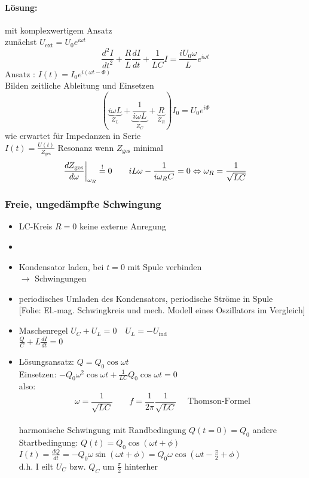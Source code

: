 \documentclass[titlepage,12pt,a4paper,ngerman]{report}
\newcommand{\tx}[1]{\textrm{#1}}
\newcommand{\ub}[1]{\underbrace{#1}}
\newcommand{\uind}{U_{\tx{ind}}}
\newcommand{\folie}[1]{\color{gray}[Folie: #1]\color{black}}
\begin{document}
\paragraph{Lösung:} mit komplexwertigem Ansatz\\
zunächst $ U_{\tx{ext}} = U_0 e^{i\omega t} $
$$ \frac{d^2 I}{dt^2} + \frac{R}{L} \frac{dI}{dt} + \frac{1}{LC} I = \frac{i U_0 \omega}{L} e ^{i \omega t}$$
Ansatz : $ I(t) = I_0 e ^{i(\omega t - \Phi)} $\\
Bilden zeitliche Ableitung und Einsetzen
$$ (\ub{i \omega L}_{Z_L} + \ub{\frac{1}{i \omega L}}_{Z_C} + \ub{R}_{Z_R} ) I_0 = U_0 e ^{i \Phi} $$
 wie erwartet für Impedanzen in Serie\\
 $ I(t) = \frac{U(t)}{Z_{\tx{ges}}} $ Resonanz wenn $ Z_{\tx{ges}} $ minimal
 $$\frac{d Z_{\tx{ges}}}{d \omega} \bigg|_{\omega_R} \buildrel ! \over = 0 \qquad i L \omega - \frac{1}{i \omega_R C} = 0 \Leftrightarrow \omega_R = \frac{1}{\sqrt{LC}}$$
 
 
 \subsubsection{Freie, ungedämpfte Schwingung}
 \begin{itemize}
 	\item LC-Kreis $ R = 0 $ keine externe Anregung
 	\item \item Kondensator laden, bei $ t=0 $ mit Spule verbinden\\
 	$ \rightarrow $ Schwingungen
 	\item periodisches Umladen des Kondensators, periodische Ströme in Spule\\
 	\folie{El.-mag. Schwingkreis und mech. Modell eines Oszillators im Vergleich}
 	\item Maschenregel $ U_C+U_L = 0 \quad U_L = -\uind $\\
 	$ \frac{Q}{C} + L \frac{dI}{dt} = 0 $
 	\item Lösungsansatz: $ Q = Q_0 \cos \omega t $\\
 	Einsetzen: $ -Q_0 \omega^2 \cos \omega t + \frac{1}{LC} Q_0 \cos \omega t = 0 $\\
 	also: $$\boxed{\omega = \frac{1}{\sqrt{LC}} \qquad f = \frac{1}{2 \pi} \frac{1}{\sqrt{LC}} } \quad \tx{ Thomson-Formel}$$\\
 	harmonische Schwingung mit Randbedingung $ Q(t=0)= Q_0 $ andere Startbedingung: $ Q(t) = Q_0 \cos(\omega t + \phi) $\\
 	$ I(t) = \frac{dQ}{dt} = - Q_0 \omega \sin(\omega t + \phi) = Q_0 \omega \cos (\omega t - \frac{\pi}{2} + \phi) $\\
 	d.h. I eilt $ U_C $ bzw. $ Q_C $ um $\frac{\pi}{2}$ hinterher
 \end{itemize}
\end{document}
